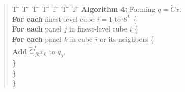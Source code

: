 \begin{singlespace}
\begin{quote}
\begin{tabbing}
T \= \kill
\>T \= \kill
\>\>T \= \kill
\>\>\>T \= \kill
\>\>\>\>T \= \kill
\>\>\>\>\>T \= \kill
\>\>\>\>\>\>T \= \kill
{\bf Algorithm 4:} Forming $ q = \tilde{C} x $.\\
\>\> {\bf For each} finest-level cube $ i = 1 $ to $ 8^L $ \{ \\
\>\>\> {\bf For each} panel $ j $ in finest-level cube $ i $ \{ \\
\>\>\>\> {\bf For each} panel $ k $ in cube $ i $ or its neighbors \{ \\
\>\>\>\>\> {\bf Add} $ \tilde{C}^i_{jk} x_k $ to $ q_j $.\\
\>\>\>\> {\bf \}}\\
\>\>\> {\bf \}}\\
\>\> {\bf \}}\\
\end{tabbing}
\end{quote}
\end{singlespace}

